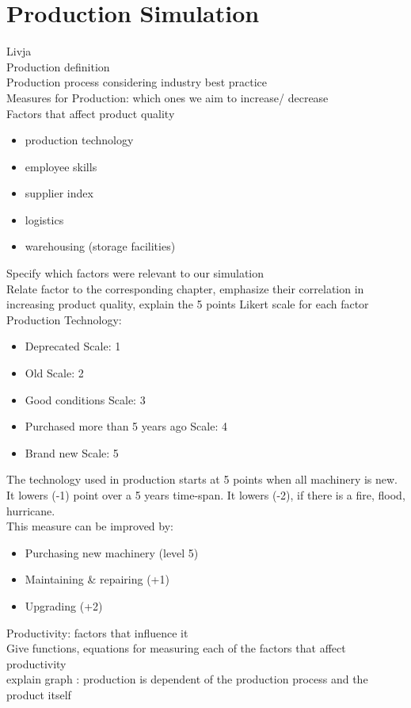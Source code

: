 \documentclass[11pt,titlepage,oneside,openany]{book}
\begin{document}
\section{Production Simulation}
\label{sec:products}
Livja \\
 Production definition \\
Production process considering industry best practice \\
Measures for Production: which ones we aim to increase/ decrease \\
 Factors that affect product quality 
\begin{itemize}
\item production technology
\item employee skills
\item supplier index
\item logistics
\item warehousing (storage facilities)
\end{itemize}
Specify which factors were relevant to our simulation \\
Relate factor to the corresponding chapter, emphasize their correlation in increasing product quality, explain the 5 points Likert scale for each factor\\
Production Technology: 
\begin{itemize}
    \item Deprecated                  Scale: 1
    \item Old                         Scale: 2
    \item Good conditions             Scale: 3
    \item Purchased more than 5 years ago Scale: 4
    \item Brand new                   Scale: 5

\end{itemize}
The technology used in production starts at 5 points when all machinery is new. It lowers (-1) point over a 5 years time-span. It lowers (-2), if there is a fire, flood, hurricane.\\
This measure can be improved by:
\begin{itemize}
    \item Purchasing new machinery (level 5)
\item Maintaining \& repairing (+1)
\item Upgrading (+2)
\end{itemize}


Productivity: factors that influence it \\
Give functions, equations for measuring each of the factors that affect productivity \\
explain graph : production is dependent of the production process and the product itself 
\end{document}
